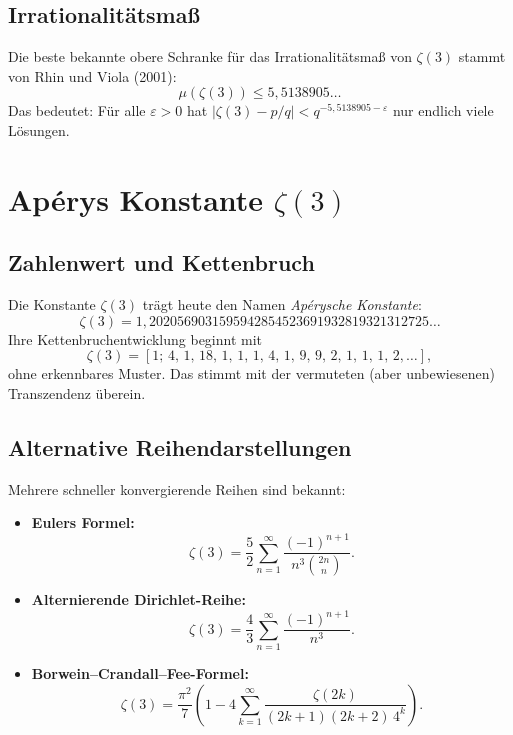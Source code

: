 \documentclass[12pt,a4paper]{amsart}
\theoremstyle{definition}
\theoremstyle{remark}
\begin{document}
\subsection{Irrationalitätsmaß}

Die beste bekannte obere Schranke für das Irrationalitätsmaß von $\zeta(3)$
stammt von Rhin und Viola (2001):
\[
  \mu(\zeta(3)) \leq 5{,}5138905\ldots
\]
Das bedeutet: Für alle $\varepsilon > 0$ hat $|\zeta(3) - p/q| < q^{-5{,}5138905-\varepsilon}$
nur endlich viele Lösungen.

\section{Apérys Konstante $\zeta(3)$}

\subsection{Zahlenwert und Kettenbruch}

Die Konstante $\zeta(3)$ trägt heute den Namen \emph{Apérysche Konstante}:
\[
  \zeta(3) = 1{,}2020569031595942854523691932819321312725\ldots
\]
Ihre Kettenbruchentwicklung beginnt mit
\[
  \zeta(3) = [1;\, 4,\, 1,\, 18,\, 1,\, 1,\, 1,\, 4,\, 1,\, 9,\, 9,\, 2,\,
  1,\, 1,\, 1,\, 2, \ldots],
\]
ohne erkennbares Muster. Das stimmt mit der vermuteten (aber unbewiesenen)
Transzendenz überein.

\subsection{Alternative Reihendarstellungen}

Mehrere schneller konvergierende Reihen sind bekannt:

\begin{itemize}[leftmargin=2em]
  \item \textbf{Eulers Formel:}
    \[
      \zeta(3) = \frac{5}{2} \sum_{n=1}^{\infty} \frac{(-1)^{n+1}}{n^3 \binom{2n}{n}}.
    \]
  \item \textbf{Alternierende Dirichlet-Reihe:}
    \[
      \zeta(3) = \frac{4}{3} \sum_{n=1}^{\infty} \frac{(-1)^{n+1}}{n^3}.
    \]
  \item \textbf{Borwein--Crandall--Fee-Formel:}
    \[
      \zeta(3) = \frac{\pi^2}{7} \left( 1 - 4 \sum_{k=1}^{\infty}
      \frac{\zeta(2k)}{(2k+1)(2k+2)\, 4^k} \right).
    \]
\end{itemize}
\end{document}
